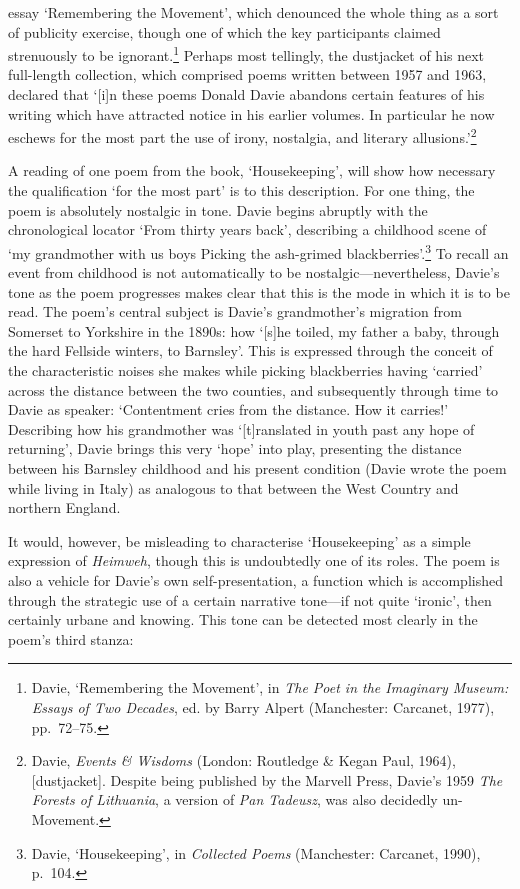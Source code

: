 \documentclass[]{article}
\begin{document}
essay ‘Remembering the Movement’, which denounced the whole thing as a
sort of publicity exercise, though one of which the key participants
claimed strenuously to be ignorant.\footnote{Davie, ‘Remembering the
  Movement’, in \emph{The Poet in the Imaginary Museum: Essays of Two
  Decades}, ed. by Barry Alpert (Manchester: Carcanet, 1977), pp.~72–75.}
Perhaps most tellingly, the dustjacket of his next full-length
collection, which comprised poems written between 1957 and 1963,
declared that ‘{[}i{]}n these poems Donald Davie abandons certain
features of his writing which have attracted notice in his earlier
volumes. In particular he now eschews for the most part the use of
irony, nostalgia, and literary allusions.’\footnote{Davie, \emph{Events
  \& Wisdoms} (London: Routledge \& Kegan Paul, 1964), {[}dustjacket{]}.
  Despite being published by the Marvell Press, Davie’s 1959 \emph{The
  Forests of Lithuania}, a version of \emph{Pan Tadeusz}, was also
  decidedly un-Movement.}

A reading of one poem from the book, ‘Housekeeping’, will show how
necessary the qualification ‘for the most part’ is to this description.
For one thing, the poem is absolutely nostalgic in tone. Davie begins
abruptly with the chronological locator ‘From thirty years back’,
describing a childhood scene of ‘my grandmother with us boys \textbar{}
Picking the ash-grimed blackberries’.\footnote{Davie, ‘Housekeeping’, in
  \emph{Collected Poems} (Manchester: Carcanet, 1990), p.~104.} To
recall an event from childhood is not automatically to be
nostalgic—nevertheless, Davie’s tone as the poem progresses makes clear
that this is the mode in which it is to be read. The poem’s central
subject is Davie’s grandmother’s migration from Somerset to Yorkshire in
the 1890s: how ‘{[}s{]}he toiled, my father a baby, through the hard
\textbar{} Fellside winters, to Barnsley’. This is expressed through the
conceit of the characteristic noises she makes while picking
blackberries having ‘carried’ across the distance between the two
counties, and subsequently through time to Davie as speaker:
‘Contentment cries from the distance. How it carries!’ Describing how
his grandmother was ‘{[}t{]}ranslated in youth past any hope of
returning’, Davie brings this very ‘hope’ into play, presenting the
distance between his Barnsley childhood and his present condition (Davie
wrote the poem while living in Italy) as analogous to that between the
West Country and northern England.

It would, however, be misleading to characterise ‘Housekeeping’ as a
simple expression of \emph{Heimweh}, though this is undoubtedly one of
its roles. The poem is also a vehicle for Davie’s own self-presentation,
a function which is accomplished through the strategic use of a certain
narrative tone—if not quite ‘ironic’, then certainly urbane and knowing.
This tone can be detected most clearly in the poem’s third stanza:
\end{document}

